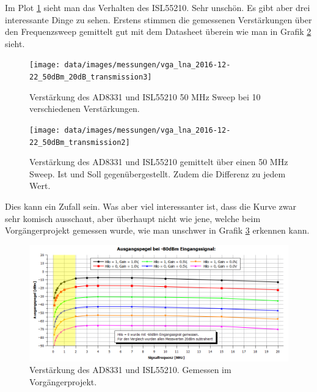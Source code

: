 Im Plot \ref{fig:T_broken_ISL55210} sieht man das Verhalten des ISL55210. Sehr unschön. Es gibt aber drei interessante Dinge zu sehen.
Erstens stimmen die gemessenen Verstärkungen über den Frequenzsweep gemittelt gut mit dem Datasheet überein wie man in Grafik \ref{fig:T_broken_mean_ISL55210} sieht.

\begin{figure}[H]
\begin{center}
    \texttt{[image: data/images/messungen/vga\_lna\_2016-12-22\_50dBm\_20dB\_transmission3]}
    \caption{Verstärkung des AD8331 und ISL55210 50 MHz Sweep bei 10 verschiedenen Verstärkungen.}
    \label{fig:T_broken_ISL55210}
\end{center}
\end{figure}

\begin{figure}[H]
\begin{center}
    \texttt{[image: data/images/messungen/vga\_lna\_2016-12-22\_50dBm\_transmission2]}
    \caption{Verstärkung des AD8331 und ISL55210 gemittelt über einen 50 MHz Sweep. Ist und Soll gegenübergestellt. Zudem die Differenz zu jedem Wert.}
    \label{fig:T_broken_mean_ISL55210}
\end{center}
\end{figure}

Dies kann ein Zufall sein. Was aber viel interessanter ist, dass die Kurve zwar sehr komisch ausschaut, aber überhaupt nicht wie jene, welche beim Vorgängerprojekt gemessen wurde, wie man unschwer in Grafik \ref{fig:ganzes_system_vorganger} erkennen kann.

\begin{figure}[H]
\begin{center}
    \includegraphics[width=1\textwidth]{data/images/ganzes_system_vorganger}
    \caption{Verstärkung des AD8331 und ISL55210. Gemessen im Vorgängerprojekt.}
    \label{fig:ganzes_system_vorganger}
\end{center}
\end{figure}

